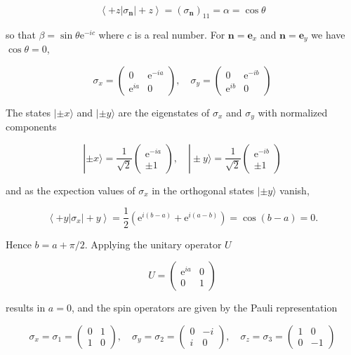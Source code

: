 \documentclass[10pt]{article}
\begin{document}
$$
\left\langle+z\left|\sigma_{\mathbf{n}}\right|+z\right\rangle=\left(\sigma_{\mathbf{n}}\right)_{11}=\alpha=\cos \theta
$$

so that $\beta=\sin \theta \mathrm{e}^{-i c}$ where $c$ is a real number. For $\mathbf{n}=\mathbf{e}_{x}$ and $\mathbf{n}=\mathbf{e}_{y}$ we have $\cos \theta=0$,

$$
\sigma_{x}=\left(\begin{array}{cc}
0 & \mathrm{e}^{-i a} \\
\mathrm{e}^{i a} & 0
\end{array}\right), \quad \sigma_{y}=\left(\begin{array}{cc}
0 & \mathrm{e}^{-i b} \\
\mathrm{e}^{i b} & 0
\end{array}\right)
$$

The states $| \pm x\rangle$ and $| \pm y\rangle$ are the eigenstates of $\sigma_{x}$ and $\sigma_{y}$ with normalized components

$$
| \pm x\rangle=\frac{1}{\sqrt{2}}\left(\begin{array}{c}
\mathrm{e}^{-i a} \\
\pm 1
\end{array}\right), \quad| \pm y\rangle=\frac{1}{\sqrt{2}}\left(\begin{array}{c}
\mathrm{e}^{-i b} \\
\pm 1
\end{array}\right)
$$

and as the expection values of $\sigma_{x}$ in the orthogonal states $| \pm y\rangle$ vanish,

$$
\left\langle+y\left|\sigma_{x}\right|+y\right\rangle=\frac{1}{2}\left(\mathrm{e}^{i(b-a)}+\mathrm{e}^{i(a-b)}\right)=\cos (b-a)=0 .
$$

Hence $b=a+\pi / 2$. Applying the unitary operator $U$

$$
U=\left(\begin{array}{cc}
\mathrm{e}^{i a} & 0 \\
0 & 1
\end{array}\right)
$$

results in $a=0$, and the spin operators are given by the Pauli representation

$$
\sigma_{x}=\sigma_{1}=\left(\begin{array}{cc}
0 & 1 \\
1 & 0
\end{array}\right), \quad \sigma_{y}=\sigma_{2}=\left(\begin{array}{cc}
0 & -i \\
i & 0
\end{array}\right), \quad \sigma_{z}=\sigma_{3}=\left(\begin{array}{cc}
1 & 0 \\
0 & -1
\end{array}\right)
$$
\end{document}
